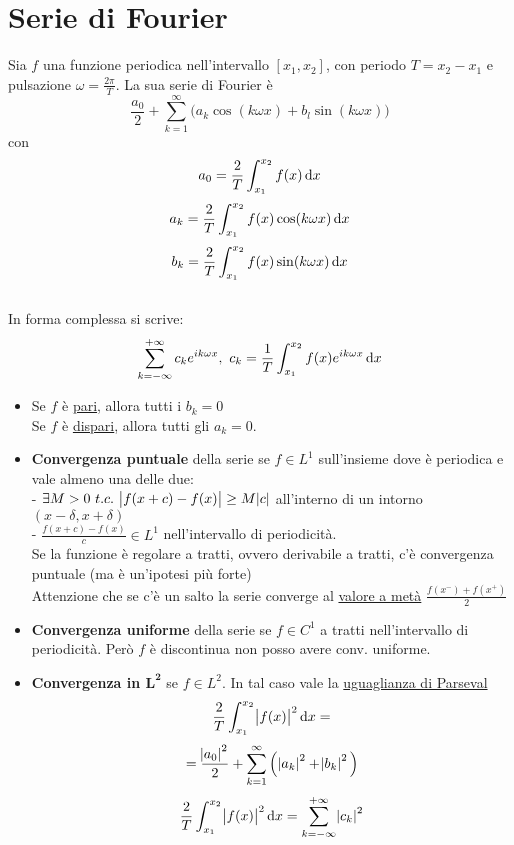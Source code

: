 \documentclass[a4paper,portrait,columns=3,5pt]{cheatsheet}
\begin{document}
\section{Serie di Fourier}
Sia $f$ una funzione periodica nell'intervallo $[x_1, x_2]$, con periodo $T = x_2 - x_1$ e pulsazione $\omega = \frac{2\pi}{T}$. La sua serie di Fourier è $$ \frac{a_0}{2} + \sum_{k=1}^{\infty} \Big (a_k \cos(k\omega x) + b_l \sin(k\omega x)\Big)$$ 
con 
$$a_0 = \frac 2 T \int_{x_1}^{x_2} f(x) \dif x$$
$$ a_k = \frac{2}{T} \int_{x_1}^{x_2} f(x) \cos(k\omega x) \dif x$$ $$ b_k = \frac{2}{T} \int_{x_1}^{x_2} f(x) \sin(k\omega x) \dif x$$ \\
In forma complessa si scrive: $$ \sum_{k=-\infty}^{+\infty} c_k e^{ik\omega x}, ~ c_k = \frac 1 T \int_{x_1}^{x_2} f(x) e^{ik\omega x} \dif x$$
\begin{itemize}
    \item Se $f$ è \underline{pari}, allora tutti i  $b_k = 0$\\Se $f$ è \underline{dispari}, allora tutti gli $a_k = 0$.
    \item \textbf{Convergenza puntuale} della serie se $f \in L^1$ sull'insieme dove è periodica e vale almeno una delle due:\\ - $\exists M> 0~t.c.~ \abs{f(x+c) - f(x)} \geq M\abs{c}$ all'interno di un intorno $(x - \delta, x + \delta)$\\ - $\frac{f(x+c) - f(x)}{c} \in L^1$ nell'intervallo di periodicità.\\
    Se la funzione è regolare a tratti, ovvero derivabile a tratti, c'è convergenza puntuale (ma è un'ipotesi più forte)\\
    Attenzione che se c'è un salto la serie converge al \underline{valore a metà} $\frac{f(x^-) + f(x^+)}{2}$
    \item \textbf{Convergenza uniforme} della serie se $f\in C^1$ a tratti nell'intervallo di periodicità. Però $f$ è discontinua non posso avere conv. uniforme.
    \item \textbf{Convergenza in $\mathbf{L^2}$} se $f \in L^2$. In tal caso vale la \underline{uguaglianza di Parseval} $$ \frac 2 T \int_{x_1}^{x_2} \abs{f(x)}^2 \dif x = $$ $$ = \frac{\abs{a_0}^2}{2} +  \sum_{k=1}^{\infty} \Big( \abs{a_k}^2 + \abs{b_k}^2 \Big)$$
    $$ \frac 2 T \int_{x_1}^{x_2} \abs{f(x)}^2 \dif x  = \sum_{k=-\infty}^{+\infty} \abs{c_k}^2$$
\end{itemize}
\end{document}
